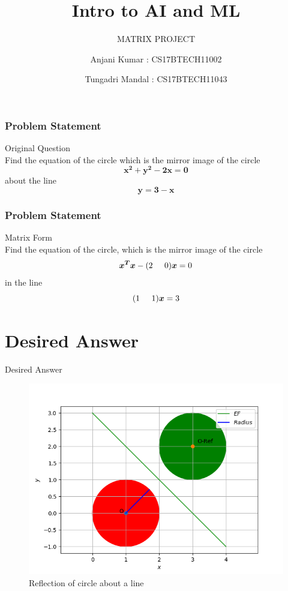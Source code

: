 \documentclass{beamer}
\title[AI and ML] %
{Intro to AI and ML}
\subtitle{MATRIX PROJECT}
\author[Anjani Kumar, Tungadri Mandal] %
{Anjani Kumar : CS17BTECH11002\inst{1} \\ \and Tungadri Mandal : CS17BTECH11043\inst{2}}
\institute[] %
{
  \inst{1, 2}
  Indian Institute of Technology, Hyderabad\\

}
\begin{document}
 

\frame{\titlepage}

\begin{frame}
\frametitle{Problem Statement }
Original Question\\
Find the equation of the circle which is the mirror image of the circle\\
\begin{equation}
    \boldsymbol{{x^2}+{y^2}-2x=0}
\end{equation}
about the line\\
\begin{equation}
    \boldsymbol{y=3-x}
\end{equation}
\end{frame}

\begin{frame}
\frametitle{Problem Statement }
Matrix Form\\
Find the equation of the circle, which is the
mirror image of the circle
\begin{equation}
    \boldsymbol{x^Tx} - (2\hspace{5mm} 0)\boldsymbol{x} = 0
\end{equation}
in the line 
\begin{equation}
    (1\hspace{5mm} 1)\boldsymbol{x} = 3
\end{equation}
\end{frame}

\section{Desired Answer}
\begin{frame}{Desired Answer}
\begin{figure}[h]
\centering
\includegraphics[scale=0.54]{figs/circles.png}
\caption{Reflection of circle about a line}
\label{etiqueta}
\end{figure}
\end{frame}
\end{document}
